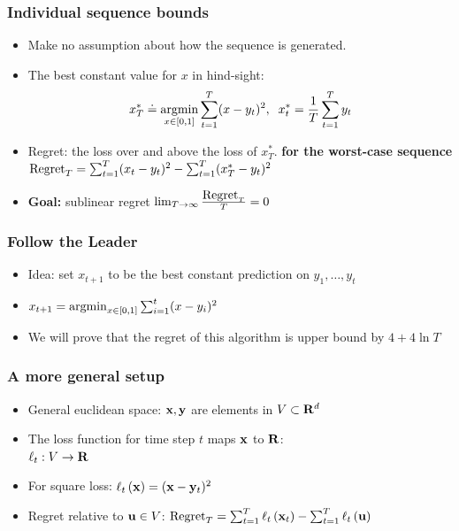 \documentclass[handout]{beamer}
\begin{document}
\begin{frame}
\frametitle{Individual sequence bounds}
\begin{itemize}
\item Make no assumption about how the sequence is generated.
\item The best constant value for $x$ in hind-sight:\\
  $$x^*_T \doteq \operatorname*{argmin}_{x \in [0,1]} \sum_{t=1}^T (x-y_t)^2,\;\; x^*_t=\frac{1}{T}
  \sum_{t=1}^T y_t$$ 
\item Regret: the loss over and above the loss of $x^*_T$. {\bf for the
    worst-case sequence}
  $ \mbox{Regret}_T = \sum_{t=1}^T (x_t-y_t)^2 - \sum_{t=1}^T (x^*_T-y_t)^2
  $
\item {\bf Goal:} sublinear regret $\lim_{T \to \infty} \frac{\mbox{Regret}_T}{T} = 0$
\end{itemize}
\end{frame}

\begin{frame}
\frametitle{Follow the Leader}
\begin{itemize}
\item Idea: set $x_{t+1}$ to be the best constant prediction on $y_1,\ldots,y_t$
\item 
  $x_{t+1} = \operatorname*{argmin}_{x \in [0,1]} \sum_{i=1}^t (x-y_i)^2$ 
\item We will prove that the regret of this algorithm is upper bound
  by $4+4 \ln T$
\end{itemize}
\end{frame}
\iffalse
\begin{frame}
\frametitle{A more general setup}
\begin{itemize}
\item General euclidean space: ${\mathbf x},{\mathbf y}$ are elements in $V \subset {\mathbf R}^d$
\item The loss function for time step $t$ maps ${\mathbf x}$ to ${\mathbf R}$:\\
  $\ell_t: V \to {\mathbf R}$
\item For square loss: $\ell_{t}\left( {\mathbf x} \right) = ({\mathbf x} -{\mathbf y}_t)^2$
\item Regret relative to ${\mathbf u} \in V$:
$\mbox{Regret}_T = \sum_{t=1}^T \ell_{t}\left( {\mathbf x}_t \right) - \sum_{t=1}^T
  \ell_{t}\left( {\mathbf u} \right) $
\end{itemize}
\end{frame}
\end{document}
